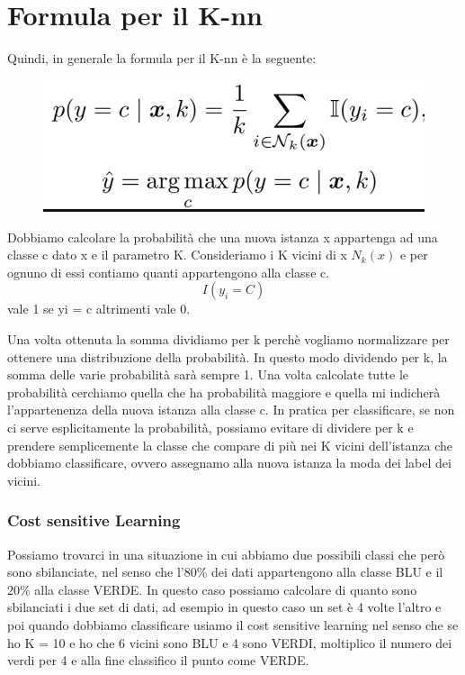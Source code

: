 \documentclass[14pt]{extreport}
\begin{document}
\section{Formula per il K-nn}

Quindi, in generale la formula per il K-nn è la seguente:

\begin{figure}[H]
	\centering
	\includegraphics[width=0.7\linewidth]{59.jpeg}
\end{figure}

Dobbiamo calcolare la probabilità che una nuova istanza x appartenga ad una classe c dato x e il parametro K. Consideriamo i K vicini di x $N_k(x)$ e
per ognuno di essi contiamo quanti appartengono alla classe c.
$$I(y_i = C)$$ vale 1 se yi = c altrimenti vale 0.

Una volta ottenuta la somma dividiamo per k perchè vogliamo normalizzare per ottenere una distribuzione della probabilità. In questo modo dividendo
per k, la somma delle varie probabilità sarà sempre 1. Una volta calcolate tutte le probabilità cerchiamo quella che ha probabilità maggiore e quella
mi indicherà l’appartenenza della nuova istanza alla classe c. In pratica per classificare, se non ci serve esplicitamente la probabilità, possiamo
evitare di dividere per k e prendere semplicemente la classe che compare di più nei K vicini dell’istanza che dobbiamo classificare, ovvero assegnamo
alla nuova istanza la moda dei label dei vicini.

\subsubsection{Cost sensitive Learning}
Possiamo trovarci in una situazione in cui abbiamo due possibili classi che però sono sbilanciate, nel senso che l’$80\%$ dei dati appartengono alla
classe BLU e il $20\%$ alla classe VERDE. In questo caso possiamo calcolare di quanto sono sbilanciati i due set di dati, ad esempio in questo caso un
set è 4 volte l’altro e poi quando dobbiamo classificare usiamo il cost sensitive learning nel senso che se ho K = 10 e ho che 6 vicini sono BLU e 4
sono VERDI, moltiplico il numero dei verdi per 4 e alla fine classifico il punto come VERDE.
\end{document}
